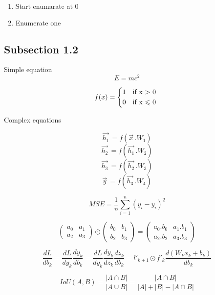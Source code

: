\documentclass{article} %
\begin{document}
\begin{enumerate}\addtocounter{enumi}{-1}
	  \item Start enumarate at 0
	  \item Enumerate one
\end{enumerate}

\subsection{Subsection 1.2}


Simple equation
\begin{equation}
	E=mc^2
\end{equation}

\begin{equation}
	f(x) =
	\begin{cases*}
		1 & if x $>$ 0\\
 		0 & if x $\leqslant$ 0
 	 \end{cases*}
\end{equation}

Complex equations

\begin{equation}\label{eq:layers}
	\vec{h_1}^{\,} = f(\vec{x}^{\,}.W_1)
\end{equation}
	$$\vec{h_2}^{\,} = f(\vec{h_1}^{\,}.W_2)$$
	$$\vec{h_3}^{\,} = f(\vec{h_2}^{\,}.W_3)$$
	$$\vec{y}^{\,} = f(\vec{h_3}^{\,}.W_4)$$

\begin{equation}\label{eq:mse}
	MSE=\frac{1}{n}\sum_{i=1}^{n}(y_{i}-\hat{y}_{i})^2
\end{equation}

$$
\begin{pmatrix} a_0 & a_1\\ a_2 & a_3 \end{pmatrix}
\odot
\begin{pmatrix} b_0 & b_1\\ b_2 & b_3 \end{pmatrix}
=
\begin{pmatrix} a_0.b_0 & a_1.b_1\\ a_2.b_2 & a_3.b_3 \end{pmatrix}
$$

$$\frac{dL}{db_k}=\frac{dL}{dy_k}\frac{dy_k}{db_k}=\frac{dL}{dy_k}\frac{dy_k}{dz_k}\frac{dz_k}{db_k}=l'_{k+1}\odot f'_k\frac{d(W_kx_k+b_k)}{db_k}$$

\begin{equation}
IoU(A,B)=\frac{|A \cap B|}{|A \cup B|}=\frac{|A \cap B|}{|A| + |B| - |A \cap B|}
\end{equation}
\end{document}
